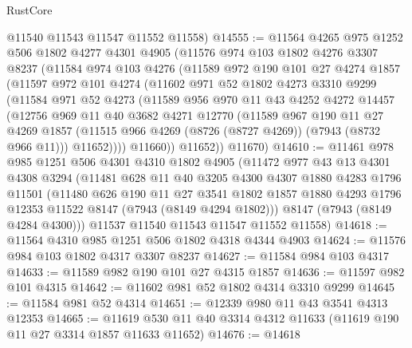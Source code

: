 \begin{lexlean}{RustCore}
\begin{coremodule}
      @11540
      @11543
      @11547
      @11552
      @11558)
@14555 := @11564
    @4265
    @975
    @1252
    @506
    @1802
    @4277
    @4301
    @4905
    (@11576
      @974
      @103
      @1802
      @4276
      @3307
      @8237
      (@11584
        @974
        @103
        @4276
        (@11589
          @972
          @190
          @101
          @27
          @4274
          @1857
          (@11597
            @972
            @101
            @4274
            (@11602
              @971
              @52
              @1802
              @4273
              @3310
              @9299
              (@11584
                @971
                @52
                @4273
                (@11589
                  @956
                  @970
                  @11
                  @43
                  @4252
                  @4272
                  @14457
                  (@12756
                    @969
                    @11
                    @40
                    @3682
                    @4271
                    @12770
                    (@11589
                      @967
                      @190
                      @11
                      @27
                      @4269
                      @1857
                      (@11515 @966 @4269 (@8726 (@8727 @4269)) (@7943 (@8732 @966 @11)))
                      @11652))))
              @11660))
          @11652))
      @11670)
@14610 := @11461
    @978
    @985
    @1251
    @506
    @4301
    @4310
    @1802
    @4905
    (@11472
      @977
      @43
      @13
      @4301
      @4308
      @3294
      (@11481
        @628
        @11
        @40
        @3205
        @4300
        @4307
        @1880
        @4283
        @1796
        @11501
        (@11480
          @626
          @190
          @11
          @27
          @3541
          @1802
          @1857
          @1880
          @4293
          @1796
          @12353
          @11522
          @8147
          (@7943 (@8149 @4294 @1802)))
        @8147
        (@7943 (@8149 @4284 @4300)))
      @11537
      @11540
      @11543
      @11547
      @11552
      @11558)
@14618 := @11564 @4310 @985 @1251 @506 @1802 @4318 @4344 @4903
@14624 := @11576 @984 @103 @1802 @4317 @3307 @8237
@14627 := @11584 @984 @103 @4317
@14633 := @11589 @982 @190 @101 @27 @4315 @1857
@14636 := @11597 @982 @101 @4315
@14642 := @11602 @981 @52 @1802 @4314 @3310 @9299
@14645 := @11584 @981 @52 @4314
@14651 := @12339 @980 @11 @43 @3541 @4313 @12353
@14665 := @11619 @530 @11 @40 @3314 @4312 @11633 (@11619 @190 @11 @27 @3314 @1857 @11633 @11652)
@14676 := @14618

\end{coremodule}
\end{lexlean}
